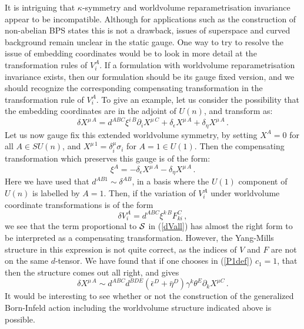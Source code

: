 \documentclass[12pt,a4paper]{article}
\begin{document}
It is intriguing that $\kappa$-symmetry
and worldvolume reparametrisation invariance
appear to be incompatible. Although for
applications such as the construction of
non-abelian BPS states this is not a drawback,
issues of superspace and curved background remain unclear in the static
gauge. One way to try to resolve  the issue of embedding
coordinates would be to look in more detail at the transformation rules
of $V_i^A$. If a formulation with worldvolume reparametrisation
invariance exists, then our formulation should be its gauge fixed version,
and we should recognize the corresponding compensating transformation
in the transformation rule of $V_i^A$. To give an example, let us consider
the possibility that the embedding coordinates are in the adjoint of
$U(n)$, and transform as:
\begin{equation}
   \delta X^{\mu\,A} = d^{ABC}\xi^{i\,B}\partial_i X^{\mu\,C}
            +\delta_\epsilon X^{\mu\,A} + \delta_\eta X^{\mu\,A}\,.
\end{equation}
Let us now gauge fix this extended worldvolume symmetry, by setting
$X^A=0$ for all $A\in SU(n)$, and $X^{\mu\,1}=\delta^\mu_i\sigma_i$
for $A=1\in U(1)$. Then the compensating transformation which
preserves this gauge is of the form:
\begin{equation}
  \xi^A = -\delta_\epsilon X^{\mu\,A} - \delta_\eta X^{\mu\,A} \,.
\end{equation}
Here we have used that $d^{AB1}\sim \delta^{AB}$, in a basis where the
$U(1)$ component of $U(n)$ is labelled by $A=1$.
Then, if the variation of $V_i^A$ under worldvolume coordinate
transformations is of the form
\begin{equation}
    \delta V_i^A = d^{ABC}\xi^{k\, B} F_{ki}^C\,,
\end{equation}
we see that the term
proportional to ${\cal S}$ in (\ref{dVall}) has almost the right form to be
interpreted as a compensating transformation. However, the Yang-Mills
structure in this expression is not quite correct, as the indices of $V$
and $F$ are not on the same $d$-tensor. We have found that if one chooses
in (\ref{P1def}) $c_1=1$, that then the structure comes out all right, and
gives
\begin{equation}
   \delta X^{\mu\,A} \sim d^{ABC}d^{BDE} (\bar\epsilon^D + \bar\eta^D)
        \gamma^k\theta^E\partial_k X^{\mu C}\,.
\end{equation}
It would be interesting to see whether or not the construction of
the generalized Born-Infeld action including the worldvolume
structure indicated above is possible.
\end{document}
